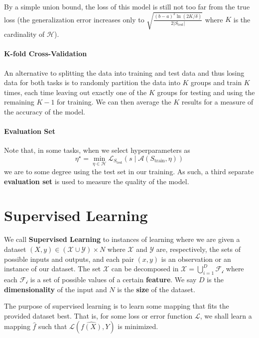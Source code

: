 \documentclass{article}
\newcommand{\loss}{\mathcal{L}}
\begin{document}
By a simple union bound, the loss of this model is still not too far from the true loss (the generalization error increases only to $\sqrt{\frac{(b-a)^2 \ln(2K/\delta)}{2|S_{\text{test}}|}}$ where $K$ is the cardinality of $\mathcal{H}$).

\paragraph{K-fold Cross-Validation}

An alternative to splitting the data into training and test data and thus losing data for both tasks is to randomly partition the data into $K$ groups and train $K$ times, each time leaving out exactly one of the $K$ groups for testing and using the remaining $K-1$ for training.
We can then average the $K$ results for a measure of the accuracy of the model.

\paragraph{Evaluation Set}

Note that, in some tasks, when we select hyperparameters as
$$
\eta^\star = \min_{\eta \in \mathcal{H}} \loss_{S_{\text{test}}} (s \mid \mathcal{A}(S_{\text{train}}, \eta))
$$
we are to some degree using the test set in our training.
As such, a third separate \textbf{evaluation set} is used to measure the quality of the model.

\section{Supervised Learning}

We call \textbf{Supervised Learning} to instances of learning where we are given a dataset $(X, y) \in (\mathcal{X} \cup \mathcal{Y}) \times N$ where $\mathcal{X}$ and $\mathcal{Y}$ are, respectively, the sets of possible inputs and outputs, and each pair $(x, y)$ is an observation or an instance of our dataset. 
The set $\mathcal{X}$ can be decomposed in $\mathcal{X} = \bigcup_{i=1}^D \mathcal{F_i}$ where each $\mathcal{F_i}$ is a set of possible values of a certain \textbf{feature}.
We say $D$ is the \textbf{dimensionality} of the input and $N$ is the \textbf{size} of the dataset.

The purpose of supervised learning is to learn some mapping that fits the provided dataset best. 
That is, for some loss or error function $\loss$, we shall learn a mapping $\hat{f}$ such that $\loss(\hat{f(X)}, Y)$ is minimized.
\end{document}
